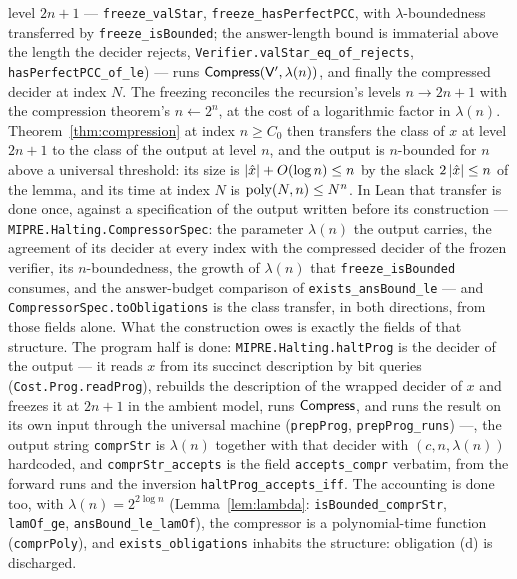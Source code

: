 \begin{remark}
\begin{enumerate}
  level $2n + 1$ --- \texttt{freeze\_valStar}, \texttt{freeze\_hasPerfectPCC},
  with $\lambda$-boundedness transferred by \texttt{freeze\_isBounded}; the answer-length
  bound is immaterial above the length the decider rejects,
  \texttt{Verifier.valStar\_eq\_of\_rejects}, \texttt{hasPerfectPCC\_of\_le}) --- runs
  $\mathsf{Compress}(\mathsf{V}', \lambda(n))$, and finally the compressed decider at index $N$. The
  freezing reconciles the recursion's levels $n \to 2n + 1$ with the compression theorem's
  $n \leftarrow 2^n$, at the cost of a logarithmic factor in $\lambda(n)$.
  Theorem~\ref{thm:compression} at index $n \geq C_0$ then transfers the class of $x$ at
  level $2n + 1$ to the class of the output at level $n$, and the output is $n$-bounded
  for $n$ above a universal threshold: its size is $\left\vert {\hat x} \right\vert + O(\log n) \leq n$ by the
  slack $2\left\vert {\hat x} \right\vert \leq n$ of the lemma, and its time at index $N$ is $\mathrm{poly}(N, n) \leq
  N^n$. In Lean that transfer is done once, against a specification of the output written
  before its construction --- \texttt{MIPRE.Halting.CompressorSpec}: the parameter
  $\lambda(n)$ the output carries, the agreement of its decider at every index with the
  compressed decider of the frozen verifier, its $n$-boundedness, the growth of $\lambda(n)$
  that \texttt{freeze\_isBounded} consumes, and the answer-budget comparison of
  \texttt{exists\_ansBound\_le} --- and \texttt{CompressorSpec.toObligations} is the class
  transfer, in both directions, from those fields alone. What the construction owes is
  exactly the fields of that structure. The program half is done: \texttt{MIPRE.Halting.haltProg}
  is the decider of the output --- it reads $x$ from its succinct description by bit queries
  (\texttt{Cost.Prog.readProg}), rebuilds the description of the wrapped decider of $x$ and
  freezes it at $2n + 1$ in the ambient model, runs $\mathsf{Compress}$, and runs the result on its own
  input through the universal machine (\texttt{prepProg}, \texttt{prepProg\_runs}) ---, the
  output string \texttt{comprStr} is $\lambda(n)$ together with that decider with $(c, n,
  \lambda(n))$ hardcoded, and \texttt{comprStr\_accepts} is the field
  \texttt{accepts\_compr} verbatim, from the forward runs and the inversion
  \texttt{haltProg\_accepts\_iff}. The accounting is done too, with $\lambda(n) = 2^{2 \log n}$
  (Lemma~\ref{lem:lambda}: \texttt{isBounded\_comprStr}, \texttt{lamOf\_ge},
  \texttt{ansBound\_le\_lamOf}), the compressor is a polynomial-time function
  (\texttt{comprPoly}), and \texttt{exists\_obligations} inhabits the structure: obligation
  (d) is discharged.

\end{enumerate}
\end{remark}
